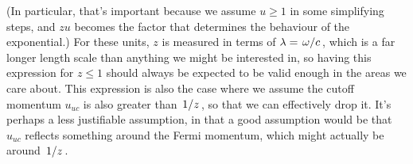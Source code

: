 \documentclass[../main.tex]{subfiles}
\begin{document}
	(In particular, that's important because we assume $u \geq 1$ in some simplifying steps, and $z u$ becomes the factor that determines the behaviour of the exponential.)
	For these units, $z$ is measured in terms of $\lambda = \flatfrac{\omega}{c}$, which is a far longer length scale than anything we might be interested in, so having this expression for $z \leq 1$ should always be expected to be valid enough in the areas we care about.
	This expression is also the case where we assume the cutoff momentum $u_{uc}$ is also greater than $\flatfrac{1}{z}$, so that we can effectively drop it.
	It's perhaps a less justifiable assumption, in that a good assumption would be that $u_{uc}$ reflects something around the Fermi momentum, which might actually be around $\flatfrac{1}{z}$.
\end{document}
